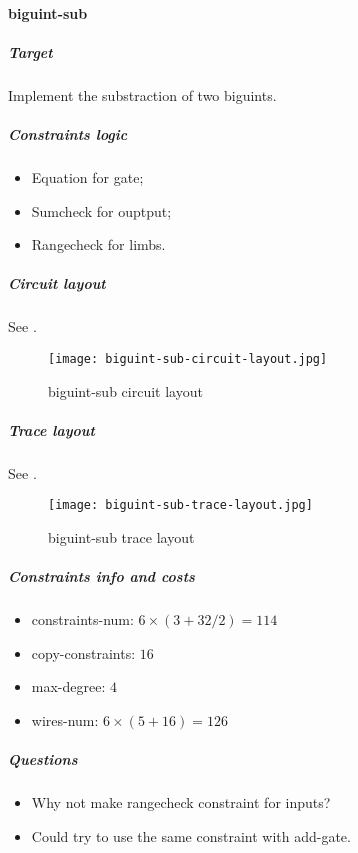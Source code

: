 \paragraph{biguint-sub}

\subparagraph{Target}
Implement the substraction of two biguints.

\subparagraph{Constraints logic}
\begin{itemize}
    \item Equation for gate;
    \item Sumcheck for ouptput;
    \item Rangecheck for limbs.
\end{itemize}

\subparagraph{Circuit layout}
See .
\begin{figure}[!ht]
    \centering
    \texttt{[image: biguint-sub-circuit-layout.jpg]}
    \caption{biguint-sub circuit layout}
    \label{fig:biguint-sub-circuit-layout}
\end{figure}

\subparagraph{Trace layout}
See .
\begin{figure}[!ht]
    \centering
    \texttt{[image: biguint-sub-trace-layout.jpg]}
    \caption{biguint-sub trace layout}
    \label{fig:biguint-sub-trace-layout}
\end{figure}

\subparagraph{Constraints info and costs}
\begin{itemize}
    \item constraints-num: $6 \times (3 + 32 / 2) = 114$
    \item copy-constraints: $16$
    \item max-degree: $4$
    \item wires-num: $6 \times (5 + 16) = 126$
\end{itemize}

\subparagraph{Questions}
\begin{itemize}
    \item Why not make rangecheck constraint for inputs?
    \item Could try to use the same constraint with add-gate.
\end{itemize}

